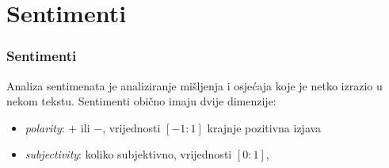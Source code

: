 \documentclass[10pt, aspectratio=169]{beamer}
\begin{document}
\section{Sentimenti}

\begin{frame}[fragile]
	\frametitle{Sentimenti}

Analiza sentimenata je analiziranje mišljenja i osjećaja koje je netko izrazio
u nekom tekstu. Sentimenti obično imaju dvije dimenzije:

\begin{itemize}
	\item \textit{polarity}:  $+$ ili $-$, vrijednosti $[-1:1]$
		krajnje pozitivna izjava
	\item \textit{subjectivity}: koliko subjektivno, vrijednosti $[0:1]$,
\end{itemize}

\end{frame}
\end{document}
